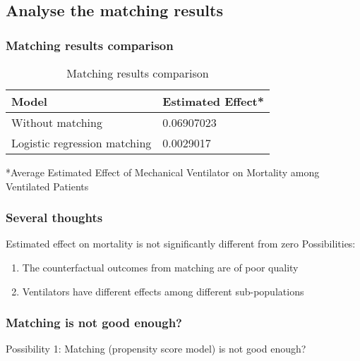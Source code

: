 \documentclass{beamer}
\begin{document}
\subsection{Analyse the matching results}
\begin{frame}
\frametitle{Matching results comparison}
\begin{table}
\begin{tabular}{l l}
\toprule
\textbf{Model} & \textbf{Estimated Effect*}\\
\midrule
Without matching & 0.06907023\\
Logistic regression matching  & 0.0029017 \\
\bottomrule
\end{tabular}
\caption{Matching results comparison}
\fontsize{3mm}{1mm}\selectfont
*Average Estimated Effect of Mechanical Ventilator on Mortality among Ventilated Patients
\end{table}
\end{frame}
\begin{frame}
\frametitle{Several thoughts}
Estimated effect on mortality is not significantly different from zero
\newline 
\pause
\newline Possibilities:
\begin{enumerate}
\item The counterfactual outcomes from matching are of poor quality
\pause
\item Ventilators have different effects among different sub-populations
\end{enumerate}
\end{frame}
\begin{frame}
\frametitle{Matching is not good enough?}
Possibility 1: Matching (propensity score model) is not good enough?
\end{frame}
\end{document}
